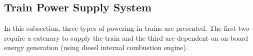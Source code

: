 \subsection{Train Power Supply System}
\label{subs:313}
In this subsection, three types of powering in trains are presented. The first two require a catenary to supply the train and the third are dependent on on-board energy generation (using diesel internal combustion engine).


